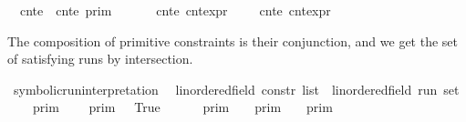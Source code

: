 \begin{isabellebody}
{\isacharbar}\ {\isacartoucheopen}{\isasymlbrakk}\ cnt{\isacharunderscore}e\ {\isasympreceq}\ cnt{\isacharunderscore}e\ {\isasymrbrakk}\isactrlsub p\isactrlsub r\isactrlsub i\isactrlsub m\ {\isacharequal}\ {\isacharbraceleft}\ {\isasymrho}{\isachardot}\ {\isasymlbrakk}\ {\isasymrho}\ {\isasymturnstile}\ cnt{\isacharunderscore}e\ {\isasymrbrakk}\isactrlsub c\isactrlsub n\isactrlsub t\isactrlsub e\isactrlsub x\isactrlsub p\isactrlsub r\ {\isasymle}\ {\isasymlbrakk}\ {\isasymrho}\ {\isasymturnstile}\ cnt{\isacharunderscore}e\ {\isasymrbrakk}\isactrlsub c\isactrlsub n\isactrlsub t\isactrlsub e\isactrlsub x\isactrlsub p\isactrlsub r\ {\isacharbraceright}{\isacartoucheclose}%
\begin{isamarkuptext}%
The composition of primitive constraints is their conjunction, and we get the
  set of satisfying runs by intersection.%
\end{isamarkuptext}\isamarkuptrue%
\isamarkupfalse%
\ symbolic{\isacharunderscore}run{\isacharunderscore}interpretation\isanewline
\ \ {\isacharcolon}{\isacharcolon}{\isacartoucheopen}{\isacharparenleft}{\isacharprime}{\isasymtau}{\isacharcolon}{\isacharcolon}linordered{\isacharunderscore}field{\isacharparenright}\ constr\ list\ {\isasymRightarrow}\ {\isacharparenleft}{\isacharprime}{\isasymtau}{\isacharcolon}{\isacharcolon}linordered{\isacharunderscore}field{\isacharparenright}\ run\ set{\isacartoucheclose}\isanewline
\ \ {\isacharparenleft}{\isacartoucheopen}{\isasymlbrakk}{\isasymlbrakk}\ {\isacharunderscore}\ {\isasymrbrakk}{\isasymrbrakk}\isactrlsub p\isactrlsub r\isactrlsub i\isactrlsub m{\isacartoucheclose}{\isacharparenright}\isanewline
{}\isanewline
\ \ {\isacartoucheopen}{\isasymlbrakk}{\isasymlbrakk}\ {\isacharbrackleft}{\isacharbrackright}\ {\isasymrbrakk}{\isasymrbrakk}\isactrlsub p\isactrlsub r\isactrlsub i\isactrlsub m\ {\isacharequal}\ {\isacharbraceleft}{\isasymrho}{\isachardot}\ True\ {\isacharbraceright}{\isacartoucheclose}\isanewline
{\isacharbar}\ {\isacartoucheopen}{\isasymlbrakk}{\isasymlbrakk}\ {\isasymgamma}\ {\isacharhash}\ {\isasymGamma}\ {\isasymrbrakk}{\isasymrbrakk}\isactrlsub p\isactrlsub r\isactrlsub i\isactrlsub m\ {\isacharequal}\ {\isasymlbrakk}\ {\isasymgamma}\ {\isasymrbrakk}\isactrlsub p\isactrlsub r\isactrlsub i\isactrlsub m\ {\isasyminter}\ {\isasymlbrakk}{\isasymlbrakk}\ {\isasymGamma}\ {\isasymrbrakk}{\isasymrbrakk}\isactrlsub p\isactrlsub r\isactrlsub i\isactrlsub m{\isacartoucheclose}\isanewline

\end{isabellebody}
